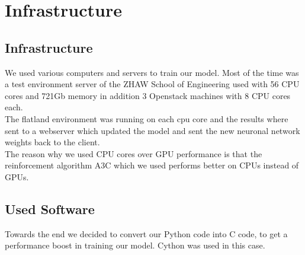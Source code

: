 \chapter{Infrastructure}\label{chap.infrastruktur}

\section{Infrastructure}\label{infrastructure}
We used various computers and servers to train our model. Most of the time was a test environment server of the ZHAW School of Engineering used
with 56 CPU cores and 721Gb memory in addition 3 Openstack machines with 8 CPU cores each. \\
The flatland environment was running on each cpu core and the results where sent to a webserver which updated the model and sent the new neuronal network weights back to the client. \\
The reason why we used CPU cores over GPU performance is that the reinforcement algorithm A3C which we used performs better on CPUs instead of GPUs. \\


\section{Used Software}\label{used_software}
Towards the end we decided to convert our Python code into C code, to get a performance boost in training our model. Cython was used in this case.\\

